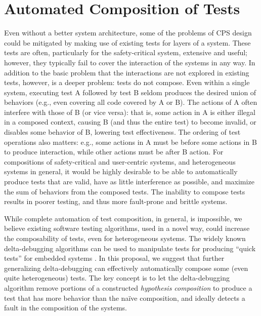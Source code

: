 \section{Automated Composition of Tests}
Even without a better system architecture, some of the problems of CPS design could be mitigated by making use of existing tests for layers of a system.  These tests are often,
particularly for the safety-critical system, extensive and useful;
however, they typically fail to cover the interaction of the systems
in any way.  In addition to the basic problem that the interactions
are not explored in existing tests, however, is a deeper problem:
tests do not compose.  Even within a single system, executing test A
followed by test B seldom produces the desired union of behaviors
(e.g., even covering all code covered by A or B).  The actions of A
often interfere with those of B (or vice versa): that is, some action
in A is either illegal in a composed context, causing B (and thus the
entire test) to become invalid, or
disables some behavior of B, lowering test effectiveness.  The
ordering of test operations also matters: e.g., some actions in A must be
before some actions in B to produce interaction, while other actions
must be after B action.    For compositions of safety-critical and
user-centric systems, and heterogeneous systems in general, it would
be highly desirable to be able to automatically produce tests that are
valid, have as little interference as possible, and maximize the sum
of behaviors from the composed tests.  The inability to compose tests
results in poorer testing, and thus more fault-prone and brittle
systems.

While complete automation of test composition, in general, is
impossible, we 
believe existing software testing algorithms, used in a  novel
way, could increase the composability of tests, even for
heterogeneous systems.  The widely known delta-debugging algorithms can
be used to manipulate tests for producing ``quick tests'' for embedded
systems \cite{icst2014}.  In this proposal, we suggest that further generalizing
delta-debugging can effectively automatically compose some (even quite heterogeneous) tests.  The key
concept is to let the delta-debugging algorithm remove portions of a
constructed \emph{hypothesis composition} to produce a test that has more
behavior than the na\"ive composition, and ideally detects a fault in
the composition of the systems.

